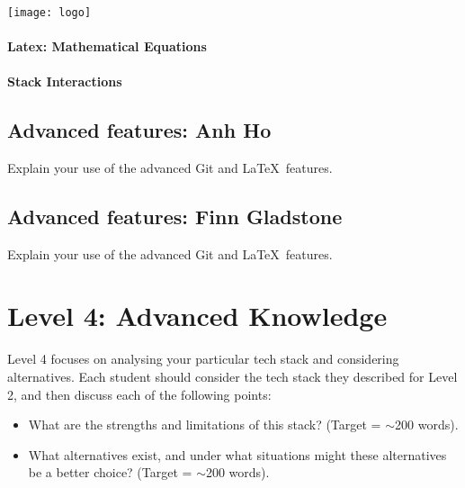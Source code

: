 \documentclass[a4paper, 11pt]{report}
\begin{document}
    \paragraph{}
    \begin{center}
    \texttt{[image: logo]}
    \end{center}
    
    \paragraph{Latex: Mathematical Equations}

	
	\paragraph{Stack Interactions}
	
	
	\subsection{Advanced features: Anh Ho}
	
	Explain your use of the advanced Git and \LaTeX\ features. 
	
	\subsection{Advanced features: Finn Gladstone}
	
	Explain your use of the advanced Git and \LaTeX\ features. 
	
 
	
	
	
	
	\newpage
	\section{Level 4: Advanced Knowledge}
	
	Level 4 focuses on analysing your particular tech stack and considering alternatives. Each student should consider the tech stack they described for Level 2, and then discuss each of the following points:
	\begin{itemize}
		\item What are the strengths and limitations of this stack? (Target = $\sim$200 words).
		\item What alternatives exist, and under what situations might these alternatives be a better choice? (Target = $\sim$200 words).
	\end{itemize}
	
\end{document}
